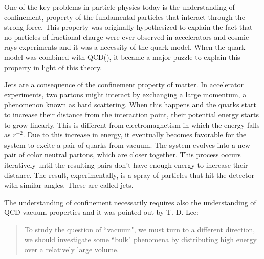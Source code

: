 One of the key problems in particle physics today is the understanding of confinement, property of the fundamental particles that interact through the strong force. This property was originally hypothesized to explain the fact that no particles of fractional charge were ever observed in accelerators and cosmic rays experiments and it was a necessity of the quark model\cite{halzen_quarks_1984}. When the quark model was combined with QCD(\qcd), it became a major puzzle to explain this property in light of this theory.
\par
Jets are a consequence of the confinement property of matter. In accelerator experiments, two partons might interact by exchanging a large momentum, a phenomenon known as hard scattering. When this happens and the quarks start to increase their distance from the interaction point, their potential energy starts to grow linearly. This is different from electromagnetism in which the energy falls as $r^{-2}$. Due to this increase in energy, it eventually becomes favorable for the system to excite a pair of quarks from vacuum\cite{dissertori_quantum_2003}. The system evolves into a new pair of color neutral partons, which are closer together. This process occurs iteratively until the resulting pairs don't have enough energy to increase their distance. The result, experimentally, is a spray of particles that hit the detector with similar angles. These are called jets.
\par
The understanding of confinement necessarily requires also the understanding of QCD vacuum properties and it was pointed out by T. D. Lee\cite{lee_abnormal_1975}:

\begin{quote}
To study the question of ``vacuum", we must turn to a different direction, we should investigate some ``bulk" phenomena by distributing high energy over a relatively large volume.
\end{quote}


